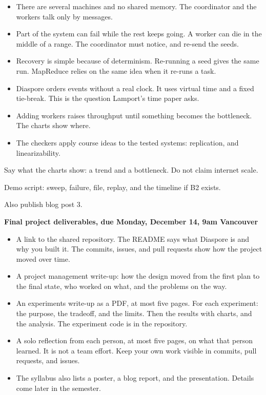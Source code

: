 \documentclass[11pt,letterpaper]{article}
\newcommand{\code}[1]{\texttt{\detokenize{#1}}}
\newcommand{\lbl}[1]{\textbf{#1}\enspace}
\begin{document}
\begin{itemize}
  \item There are several machines and no shared memory. The coordinator and the workers talk only by messages.
  \item Part of the system can fail while the rest keeps going. A worker can die in the middle of a range. The coordinator must notice, and re-send the seeds.
  \item Recovery is simple because of determinism. Re-running a seed gives the same run. MapReduce relies on the same idea when it re-runs a task.
  \item Diaspore orders events without a real clock. It uses virtual time and a fixed tie-break. This is the question Lamport's time paper asks.
  \item Adding workers raises throughput until something becomes the bottleneck. The charts show where.
  \item The checkers apply course ideas to the tested systems: replication, and linearizability.
\end{itemize}

Say what the charts show: a trend and a bottleneck. Do not claim internet scale.

Demo script: sweep, failure, \code{.pappus} file, replay, and the timeline if B2 exists.

Also publish blog post 3.

\lbl{Final project deliverables, due Monday, December 14, 9am Vancouver}

\begin{itemize}
  \item A link to the shared repository. The README says what Diaspore is and why you built it. The commits, issues, and pull requests show how the project moved over time.
  \item A project management write-up: how the design moved from the first plan to the final state, who worked on what, and the problems on the way.
  \item An experiments write-up as a PDF, at most five pages. For each experiment: the purpose, the tradeoff, and the limits. Then the results with charts, and the analysis. The experiment code is in the repository.
  \item A solo reflection from each person, at most five pages, on what that person learned. It is not a team effort. Keep your own work visible in commits, pull requests, and issues.
  \item The syllabus also lists a poster, a blog report, and the presentation. Details come later in the semester.
\end{itemize}
\end{document}
